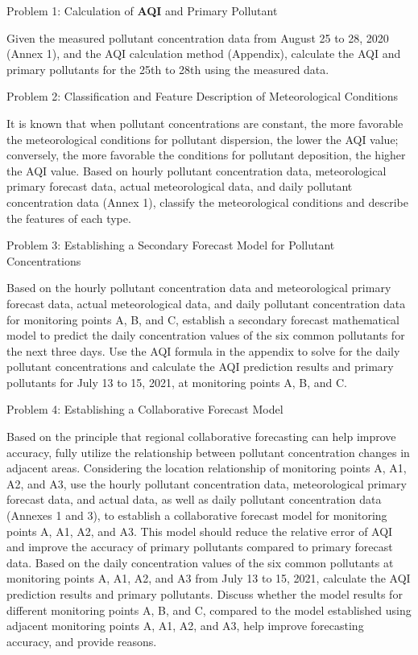 \documentclass[12pt]{article}
\begin{document}
Problem 1: Calculation of \textbf{AQI} and Primary Pollutant

Given the measured pollutant concentration data from August 25 to 28, 2020 (Annex 1), and the AQI calculation method (Appendix), calculate the AQI and primary pollutants for the 25th to 28th using the measured data.

Problem 2: Classification and Feature Description of Meteorological Conditions

It is known that when pollutant concentrations are constant, the more favorable the meteorological conditions for pollutant dispersion, the lower the AQI value; conversely, the more favorable the conditions for pollutant deposition, the higher the AQI value. Based on hourly pollutant concentration data, meteorological primary forecast data, actual meteorological data, and daily pollutant concentration data (Annex 1), classify the meteorological conditions and describe the features of each type.

Problem 3: Establishing a Secondary Forecast Model for Pollutant Concentrations

Based on the hourly pollutant concentration data and meteorological primary forecast data, actual meteorological data, and daily pollutant concentration data for monitoring points A, B, and C, establish a secondary forecast mathematical model to predict the daily concentration values of the six common pollutants for the next three days. Use the AQI formula in the appendix to solve for the daily pollutant concentrations and calculate the AQI prediction results and primary pollutants for July 13 to 15, 2021, at monitoring points A, B, and C.

Problem 4: Establishing a Collaborative Forecast Model

Based on the principle that regional collaborative forecasting can help improve accuracy, fully utilize the relationship between pollutant concentration changes in adjacent areas. Considering the location relationship of monitoring points A, A1, A2, and A3, use the hourly pollutant concentration data, meteorological primary forecast data, and actual data, as well as daily pollutant concentration data (Annexes 1 and 3), to establish a collaborative forecast model for monitoring points A, A1, A2, and A3. This model should reduce the relative error of AQI and improve the accuracy of primary pollutants compared to primary forecast data. Based on the daily concentration values of the six common pollutants at monitoring points A, A1, A2, and A3 from July 13 to 15, 2021, calculate the AQI prediction results and primary pollutants. Discuss whether the model results for different monitoring points A, B, and C, compared to the model established using adjacent monitoring points A, A1, A2, and A3, help improve forecasting accuracy, and provide reasons.
\end{document}
